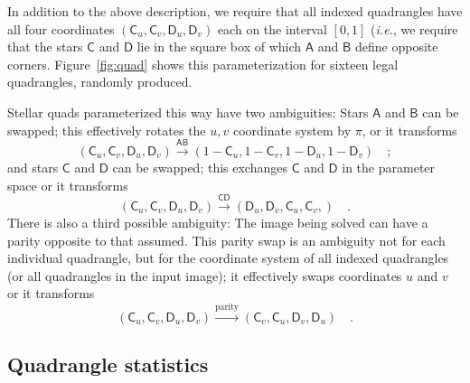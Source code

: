 \documentclass[12pt,preprint]{aastex}
\newcommand{\latin}[1]{\textit{#1}}
\newcommand{\ie}{\latin{i.e.}}
\newcommand{\starlabel}[1]{\mathsf{#1}}
\newcommand{\AAA}{\starlabel{A}}
\newcommand{\BBB}{\starlabel{B}}
\newcommand{\CCC}{\starlabel{C}}
\newcommand{\DDD}{\starlabel{D}}
\begin{document}
In addition to the above description, we require that all indexed
quadrangles have all four coordinates $(\CCC_u,\CCC_v,\DDD_u,\DDD_v)$
each on the interval $[0,1]$ (\ie, we require that the stars $\CCC$
and $\DDD$ lie in the square box of which $\AAA$ and $\BBB$ define
opposite corners.  Figure~\ref{fig:quad} shows this parameterization
for sixteen legal quadrangles, randomly produced.

Stellar quads parameterized this way have two ambiguities:  Stars
$\AAA$ and $\BBB$ can be swapped; this effectively rotates the $u,v$
coordinate system by $\pi$, or it transforms
\begin{equation}
(\CCC_u,\CCC_v,\DDD_u,\DDD_v) \stackrel{\AAA\BBB}{\rightarrow}
  (1-\CCC_u,1-\CCC_v,1-\DDD_u,1-\DDD_v) \quad ;
\end{equation}
and stars $\CCC$ and $\DDD$ can be swapped; this exchanges $\CCC$ and
$\DDD$ in the parameter space or it transforms
\begin{equation}
(\CCC_u,\CCC_v,\DDD_u,\DDD_v) \stackrel{\CCC\DDD}{\rightarrow}
  (\DDD_u,\DDD_v,\CCC_u,\CCC_v,) \quad .
\end{equation}
There is also a third possible ambiguity: The image being solved can
have a parity opposite to that assumed.  This parity swap is an
ambiguity not for each individual quadrangle, but for the coordinate
system of all indexed quadrangles (or all quadrangles in the input
image); it effectively swaps coordinates $u$ and $v$ or it transforms
\begin{equation}
(\CCC_u,\CCC_v,\DDD_u,\DDD_v) \stackrel{\mathrm{parity}}{\rightarrow}
  (\CCC_v,\CCC_u,\DDD_v,\DDD_u) \quad .
\end{equation}

\subsection{Quadrangle statistics}
\end{document}
